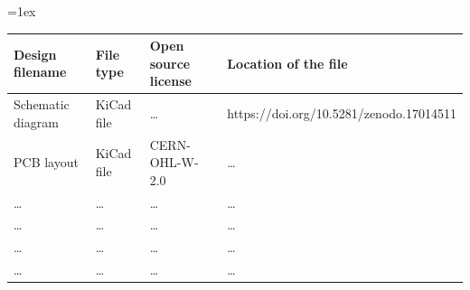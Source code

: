 \documentclass[11pt, letterpaper]{article}
\begin{document}
\vskip 0.1cm
\tabulinesep=1ex
\begin{tabu} to \linewidth {|X|X|X[1.5,1]|X[1.5,1]|}
  \hline
  \textbf{Design filename}            & \textbf{File type}                      & \textbf{Open source license}                                                                                                     & \textbf{Location of the file}                                                                   \\\hline
  Schematic diagram                               & KiCad file                                   & \dots                                                                                                                            & https://doi.org/10.5281/zenodo.17014511                                                                                           \\\hline
  PCB layout                               & KiCad file                                  &  CERN-OHL-W-2.0                                                                                                                           & \dots                                                                                           \\\hline
  
  \dots                               & \dots                                   & \dots                                                                                                                            & \dots                                                                                           \\\hline
  
  \dots                               & \dots                                   & \dots                                                                                                                            & \dots                                                                                           \\\hline
  
  \dots                               & \dots                                   & \dots                                                                                                                            & \dots                                                                                           \\\hline
  
  \dots                               & \dots                                   & \dots                                                                                                                            & \dots                                                                                           \\\hline
\end{tabu}
\end{document}
